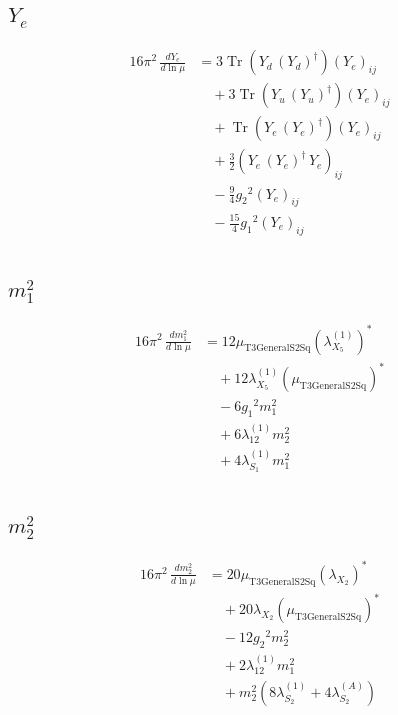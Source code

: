 \documentclass[10pt,a4paper]{article}
\begin{document}
\subsection*{$Y_e$}
\begin{align*}
16\pi^2\,\frac{d Y_e}{d\ln\mu} &=3 \operatorname{Tr}\!\left({Y_d}\,\left({Y_d}\right)^{\dagger}\right) \left({Y_e}\right)_{ij} \\
&\quad +3 \operatorname{Tr}\!\left({Y_u}\,\left({Y_u}\right)^{\dagger}\right) \left({Y_e}\right)_{ij} \\
&\quad +\operatorname{Tr}\!\left({Y_e}\,\left({Y_e}\right)^{\dagger}\right) \left({Y_e}\right)_{ij} \\
&\quad +\frac{3}{2} \left({Y_e}\,\left({Y_e}\right)^{\dagger}\,{Y_e}\right)_{ij} \\
&\quad -\frac{9}{4} {g_2}^2 \left({Y_e}\right)_{ij} \\
&\quad -\frac{15}{4} {g_1}^2 \left({Y_e}\right)_{ij} \\
\end{align*}
\subsection*{$m_1^2$}
\begin{align*}
16\pi^2\,\frac{d m_1^2}{d\ln\mu} &=12 {\mu_{\mathrm{T3GeneralS2Sq}}} \left({\lambda_{X_{5}}^{(1)}}\right)^{*} \\
&\quad +12 {\lambda_{X_{5}}^{(1)}} \left({\mu_{\mathrm{T3GeneralS2Sq}}}\right)^{*} \\
&\quad -6 {g_1}^2 {m_1^2} \\
&\quad +6 {\lambda_{12}^{(1)}} {m_2^2} \\
&\quad +4 {\lambda_{S_1}^{(1)}} {m_1^2} \\
\end{align*}
\subsection*{$m_2^2$}
\begin{align*}
16\pi^2\,\frac{d m_2^2}{d\ln\mu} &=20 {\mu_{\mathrm{T3GeneralS2Sq}}} \left({\lambda_{X_{2}}}\right)^{*} \\
&\quad +20 {\lambda_{X_{2}}} \left({\mu_{\mathrm{T3GeneralS2Sq}}}\right)^{*} \\
&\quad -12 {g_2}^2 {m_2^2} \\
&\quad +2 {\lambda_{12}^{(1)}} {m_1^2} \\
&\quad +{m_2^2} (8 {\lambda_{S_2}^{(1)}}+4 {\lambda_{S_2}^{(A)}}) \\
\end{align*}
\end{document}
